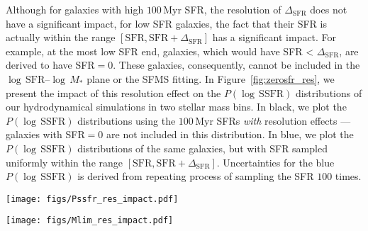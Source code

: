 \documentclass[preprint2,tighten]{aastex62}
\begin{document}
Although for galaxies with high $100\,\mathrm{Myr}$ SFR, the resolution 
of $\Delta_\mathrm{SFR}$ does not have a significant impact, for low SFR
galaxies, the fact that their SFR is actually within the range 
$[\mathrm{SFR}, \mathrm{SFR}+\Delta_\mathrm{SFR}]$ has a significant 
impact. For example, at the most low SFR end, galaxies, which would 
have SFR < $\Delta_\mathrm{SFR}$, are derived to have SFR$=0$. These 
galaxies, consequently, cannot be included in the
$\log\,\mathrm{SFR}$--$\log\,M_*$ plane or the SFMS fitting. In
Figure~\ref{fig:zerosfr_res}, we present the impact of this resolution 
effect on the $P(\log\,\mathrm{SSFR})$ distributions of our 
hydrodynamical simulations in two stellar mass bins. In black, we 
plot the $P(\log\,\mathrm{SSFR})$ distributions using the 
$100\,\mathrm{Myr}$ SFRs \emph{with} resolution effects --- galaxies 
with SFR$=0$ are not included in this distribution. In blue, we 
plot the $P(\log\,\mathrm{SSFR})$ distributions of the same galaxies, 
but with SFR sampled uniformly within the range 
$[\mathrm{SFR}, \mathrm{SFR}+\Delta_\mathrm{SFR}]$. Uncertainties 
for the blue $P(\log\,\mathrm{SSFR})$ is derived from repeating process of
sampling the SFR $100$ times. 

\begin{figure*}
\begin{center}
\texttt{[image: figs/Pssfr\_res\_impact.pdf]} 
\caption{The impact of SFR resolution and galaxies with SFR$=0$, on 
the SSFR distribution, $P(\mathrm{SSFR})$, of Illustris, EAGLE, and 
MUFSAS simulations. We plot $P(\mathrm{SSFR})$ with $\mathrm{SFR} = 0$
galaxies in blue and $P(\mathrm{SSFR})$ without $\mathrm{SFR} = 0$ 
galaxies in black. The uncertainties of $P(\mathrm{SSFR})$ is obtained 
from re-sampling the SFR of each galaxy based on the SFR resolution, 
as described in  Appendix~\ref{app:zerosfr}. For each simulation, we 
present two distinct stellar mass bins to illustrate the impact at low 
and high $M_*$.
} 
\label{fig:zerosfr_res}
\end{center}
\end{figure*}

\begin{figure*}
\begin{center}
\texttt{[image: figs/Mlim\_res\_impact.pdf]} 
\caption{Resolution effects of hydrodynamical simulations (Illustris, 
EAGLE, and MUFASA) impact our SFMS fitting for SFR averaged over 
$100\,\mathrm{Myr}$ at low stellar mass. We therefore determine stellar
mass limits based on the discrepancy between the SFMS fits neglecting 
the resolution limit (black) and fits trying to include the resolution 
limit by re-sampling the SFRs (orange; Appendix~\ref{app:zerosfr}). For
Illustris, EAGLE, and MUFASA we set $\log M_\mathrm{lim} = 8.4, 8.6$, and 
$9.4$, respectively.} 
\label{fig:mlim_res}
\end{center}
\end{figure*}
\end{document}
